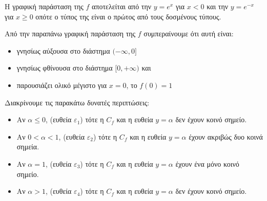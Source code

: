 \begin{alist}
\item Η γραφική παράσταση της $f$ αποτελείται από την $y = e^x$ για $x < 0$ και την $y = e^{-x}$ για $x \ge 0$ οπότε ο τύπος της είναι ο πρώτος από τους δοσμένους τύπους.
\begin{center}
\end{center}
\item Από την παραπάνω γραφική παράσταση της $f$ συμπεραίνουμε ότι αυτή είναι:
\begin{itemize}
    \item γνησίως αύξουσα στο διάστημα $(-\infty, 0]$
    \item γνησίως φθίνουσα στο διάστημα $[0, +\infty)$ και
    \item παρουσιάζει ολικό μέγιστο για $x = 0$, το $f(0) = 1$
\end{itemize}
\item Διακρίνουμε τις παρακάτω δυνατές περιπτώσεις:
\begin{itemize}
    \item Αν $\alpha \le 0$, (ευθεία $\varepsilon_1$) τότε η $C_f$ και η ευθεία $y = \alpha$ δεν έχουν κοινό σημείο.
    \item Αν $0 < \alpha < 1$, (ευθεία $\varepsilon_2$) τότε η $C_f$ και η ευθεία $y = \alpha$ έχουν ακριβώς δυο κοινά σημεία.
    \item Αν $\alpha = 1$, (ευθεία $\varepsilon_3$) τότε η $C_f$ και η ευθεία $y = \alpha$ έχουν ένα μόνο κοινό σημείο.
    \item Αν $\alpha > 1$, (ευθεία $\varepsilon_4$) τότε η $C_f$ και η ευθεία $y = \alpha$ δεν έχουν κοινό σημείο.
\end{itemize}
\begin{center}

\end{center}
\end{alist}
